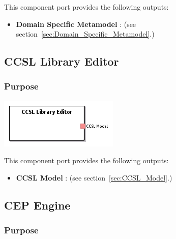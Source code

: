 \documentclass{gemoc} %
\begin{document}
This component port provides the following outputs:
\begin{itemize}
  \item \textbf{Domain Specific Metamodel} :
(see section~\ref{sec:Domain_Specific_Metamodel}.)
\end{itemize}


\subsection{CCSL Library Editor}
\label{sec:CCSL_Library_Editor}


\subsubsection{Purpose}


\begin{center}
\includegraphics*[trim=0.0cm 0.0cm 0cm 0.0cm, clip=true]{../images/generated/Generated_CCSL_Library_Editor.png}
\end{center}


This component port provides the following outputs:
\begin{itemize}
  \item \textbf{CCSL Model} :
(see section~\ref{sec:CCSL_Model}.)
\end{itemize}


\subsection{CEP Engine}
\label{sec:CEP_Engine}


\subsubsection{Purpose}
\end{document}
